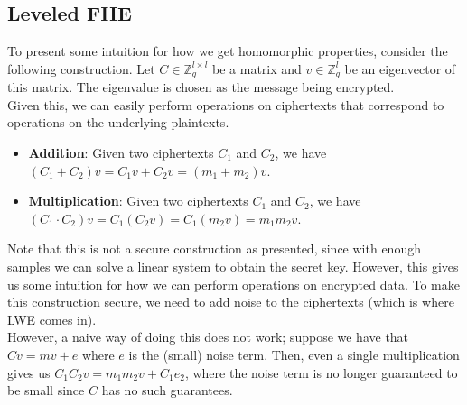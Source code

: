 \documentclass[12pt]{tufte-book}
\begin{document}
\subsection{Leveled FHE}
To present some intuition for how we get homomorphic properties, consider the following construction. Let $C \in \mathbb{Z}_q^{l \times l}$ be a matrix and $v \in \mathbb{Z}_q^l$ be an eigenvector of this matrix. The eigenvalue is chosen as the message being encrypted. \\
Given this, we can easily perform operations on ciphertexts that correspond to operations on the underlying plaintexts.
\begin{itemize}
    \item \textbf{Addition}: Given two ciphertexts $C_1$ and $C_2$, we have $(C_1 + C_2) v = C_1 v + C_2 v = (m_1 + m_2) v$.
    \item \textbf{Multiplication}: Given two ciphertexts $C_1$ and $C_2$, we have $(C_1 \cdot C_2) v = C_1 (C_2 v) = C_1 (m_2 v) = m_1 m_2 v$.
\end{itemize}
Note that this is not a secure construction as presented, since with enough samples we can solve a linear system to obtain the secret key. However, this gives us some intuition for how we can perform operations on encrypted data. To make this construction secure, we need to add noise to the ciphertexts (which is where LWE comes in). \\
However, a naive way of doing this does not work; suppose we have that $Cv = m v + e$ where $e$ is the (small) noise term. Then, even a single multiplication gives us $C_1 C_2 v = m_1 m_2 v + C_1 e_2$, where the noise term is no longer guaranteed to be small since $C$ has no such guarantees.
\end{document}
